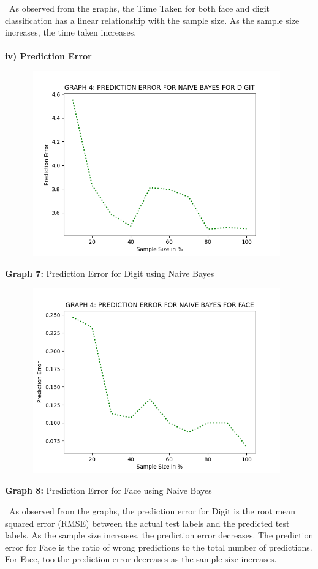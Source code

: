 \documentclass[10 pt]{report}   	%
\begin{document}
{\begin{center}
\end{center}
\textbullet\ As observed from the graphs, the Time Taken for both face and digit classification has a linear relationship with the sample size. As the sample size increases, the time taken increases.\\ \\
\textbf{iv) Prediction Error}
\begin{figure} [H]
\includegraphics [width = 11cm, height = 8cm]{NB_PRED_DIGIT.png}
\end {figure}
\begin{center}
\small \textbf {Graph 7:} Prediction Error for Digit using Naive Bayes\\
\end{center}
\begin{figure} [H]
\includegraphics [width = 11cm, height = 8cm]{NB_PRED_FACE.png}
\end {figure}
\begin{center}
\small \textbf {Graph 8:} Prediction Error for Face using Naive Bayes\\
\end{center}
\textbullet\ As observed from the graphs, the prediction error for Digit is the root mean squared error (RMSE) between the actual test labels and the predicted test labels. As the sample size increases, the prediction error decreases. The prediction error for Face is the ratio of wrong predictions to the total number of predictions. For Face, too the prediction error decreases as the sample size increases.
}
\end{document}
